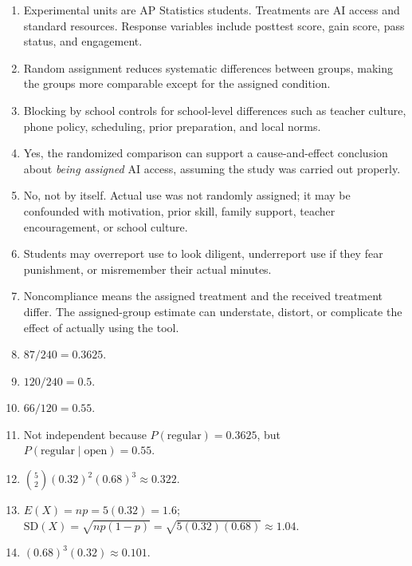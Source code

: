 \documentclass[11pt]{article}
\begin{document}
\begin{enumerate}[leftmargin=*]
\item Experimental units are AP Statistics students. Treatments are
AI access and standard resources. Response variables include
posttest score, gain score, pass status, and engagement.

\item Random assignment reduces systematic differences between
groups, making the groups more comparable except for the assigned
condition.

\item Blocking by school controls for school-level differences such
as teacher culture, phone policy, scheduling, prior preparation,
and local norms.

\item Yes, the randomized comparison can support a cause-and-effect
conclusion about \emph{being assigned} AI access, assuming the
study was carried out properly.

\item No, not by itself. Actual use was not randomly assigned; it may
be confounded with motivation, prior skill, family support,
teacher encouragement, or school culture.

\item Students may overreport use to look diligent, underreport use
if they fear punishment, or misremember their actual minutes.

\item Noncompliance means the assigned treatment and the received
treatment differ. The assigned-group estimate can understate,
distort, or complicate the effect of actually using the tool.

\item $87/240 = 0.3625$.

\item $120/240 = 0.5$.

\item $66/120 = 0.55$.

\item Not independent because $P(\text{regular}) = 0.3625$, but
$P(\text{regular} \mid \text{open}) = 0.55$.

\item $\binom{5}{2}(0.32)^2(0.68)^3 \approx 0.322$.

\item $E(X) = np = 5(0.32) = 1.6$;
$\text{SD}(X) = \sqrt{np(1-p)} = \sqrt{5(0.32)(0.68)} \approx 1.04$.

\item $(0.68)^3(0.32) \approx 0.101$.


\end{enumerate}
\end{document}
